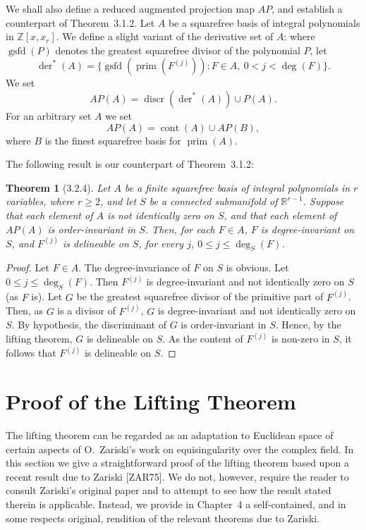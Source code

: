 \documentclass[11pt]{article}
\theoremstyle{plain}
\newtheorem*{theorem*}{Theorem}
\theoremstyle{definition}
\newcommand{\R}{\mathbb{R}}
\newcommand{\Z}{\mathbb{Z}}
\DeclareMathOperator{\discr}{discr}
\DeclareMathOperator{\cont}{cont}
\DeclareMathOperator{\prm}{prim}
\DeclareMathOperator{\der}{der}
\DeclareMathOperator{\gsfd}{gsfd}
\begin{document}
We shall also define a reduced augmented projection map $AP$, and
establish a counterpart of Theorem~3.1.2. Let $A$ be a squarefree
basis of integral polynomials in $\Z[x, x_r]$. We define a slight
variant of the derivative set of $A$: where $\gsfd(P)$ denotes the
greatest squarefree divisor of the polynomial $P$, let
\[
\der^*(A) = \{ \gsfd(\prm(F^{(j)})) : F \in A,\ 0 < j < \deg(F) \}.
\]
We set
\[
AP(A) = \discr(\der^*(A)) \cup P(A).
\]
For an arbitrary set $A$ we set
\[
AP(A) = \cont(A) \cup AP(B),
\]
where $B$ is the finest squarefree basis for $\prm(A)$.

The following result is our counterpart of Theorem~3.1.2:

\begin{theorem*}[3.2.4]
Let $A$ be a finite squarefree basis of integral polynomials in $r$
variables, where $r \ge 2$, and let $S$ be a connected submanifold of
$\R^{r-1}$. Suppose that each element of $A$ is not identically zero
on $S$, and that each element of $AP(A)$ is order-invariant in $S$.
Then, for each $F \in A$, $F$ is degree-invariant on $S$, and
$F^{(j)}$ is delineable on $S$, for every $j$, $0 \le j \le \deg_S(F)$.
\end{theorem*}

\begin{proof}
Let $F \in A$. The degree-invariance of $F$ on $S$ is obvious. Let
$0 \le j \le \deg_S(F)$. Then $F^{(j)}$ is degree-invariant and not
identically zero on $S$ (as $F$ is). Let $G$ be the greatest squarefree
divisor of the primitive part of $F^{(j)}$. Then, as $G$ is a divisor
of $F^{(j)}$, $G$ is degree-invariant and not identically zero on $S$.
By hypothesis, the discriminant of $G$ is order-invariant in $S$.
Hence, by the lifting theorem, $G$ is delineable on $S$. As the content
of $F^{(j)}$ is non-zero in $S$, it follows that $F^{(j)}$ is
delineable on $S$.
\end{proof}

\section{Proof of the Lifting Theorem}

The lifting theorem can be regarded as an adaptation to Euclidean space
of certain aspects of O.\ Zariski's work on equisingularity over the
complex field. In this section we give a straightforward proof of the
lifting theorem based upon a recent result due to Zariski [ZAR75]. We
do not, however, require the reader to consult Zariski's original paper
and to attempt to see how the result stated therein is applicable.
Instead, we provide in Chapter~4 a self-contained, and in some respects
original, rendition of the relevant theorems due to Zariski.
\end{document}
